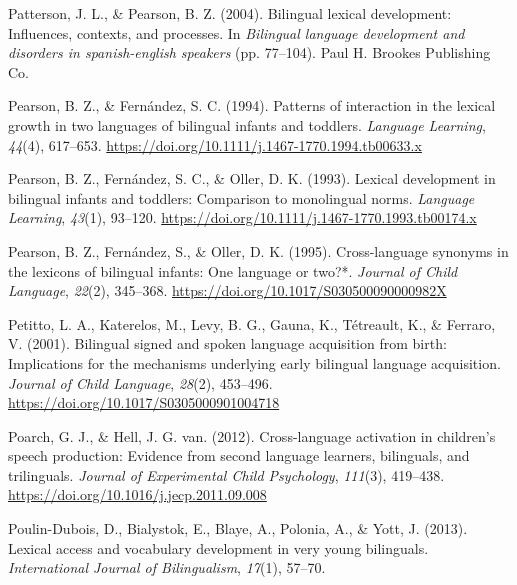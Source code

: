 \documentclass[
  man,
  floatsintext,
  colorlinks=true,linkcolor=blue,citecolor=blue,urlcolor=blue,biblatex]{apa7}
\newlength{\cslhangindent}
\newlength{\cslentryspacingunit} %
\newenvironment{CSLReferences}[2] %
 {%
  \setlength{\parindent}{0pt}
  \ifodd #1
  \let\oldpar\par
  \def\par{\hangindent=\cslhangindent\oldpar}
  \fi
  \setlength{\parskip}{#2\cslentryspacingunit}
 }%
 {}
\begin{document}
\begin{CSLReferences}{1}{0}
\leavevmode{}%
Patterson, J. L., \& Pearson, B. Z. (2004). Bilingual lexical
development: Influences, contexts, and processes. In \emph{Bilingual
language development and disorders in spanish-english speakers} (pp.
77--104). Paul H. Brookes Publishing Co.

\leavevmode{}%
Pearson, B. Z., \& Fernández, S. C. (1994). Patterns of interaction in
the lexical growth in two languages of bilingual infants and toddlers.
\emph{Language Learning}, \emph{44}(4), 617--653.
\url{https://doi.org/10.1111/j.1467-1770.1994.tb00633.x}

\leavevmode{}%
Pearson, B. Z., Fernández, S. C., \& Oller, D. K. (1993). Lexical
development in bilingual infants and toddlers: Comparison to monolingual
norms. \emph{Language Learning}, \emph{43}(1), 93--120.
\url{https://doi.org/10.1111/j.1467-1770.1993.tb00174.x}

\leavevmode{}%
Pearson, B. Z., Fernández, S., \& Oller, D. K. (1995). Cross-language
synonyms in the lexicons of bilingual infants: One language or two?*.
\emph{Journal of Child Language}, \emph{22}(2), 345--368.
\url{https://doi.org/10.1017/S030500090000982X}

\leavevmode{}%
Petitto, L. A., Katerelos, M., Levy, B. G., Gauna, K., Tétreault, K., \&
Ferraro, V. (2001). Bilingual signed and spoken language acquisition
from birth: Implications for the mechanisms underlying early bilingual
language acquisition. \emph{Journal of Child Language}, \emph{28}(2),
453--496. \url{https://doi.org/10.1017/S0305000901004718}

\leavevmode{}%
Poarch, G. J., \& Hell, J. G. van. (2012). Cross-language activation in
children's speech production: Evidence from second language learners,
bilinguals, and trilinguals. \emph{Journal of Experimental Child
Psychology}, \emph{111}(3), 419--438.
\url{https://doi.org/10.1016/j.jecp.2011.09.008}

\leavevmode{}%
Poulin-Dubois, D., Bialystok, E., Blaye, A., Polonia, A., \& Yott, J.
(2013). Lexical access and vocabulary development in very young
bilinguals. \emph{International Journal of Bilingualism}, \emph{17}(1),
57--70.


\end{CSLReferences}
\end{document}
